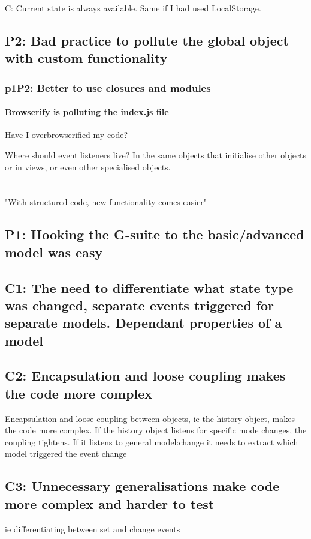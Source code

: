 \documentclass[english]{ifimaster}
\begin{document}
C: Current state is always available. Same if I had used LocalStorage.
\section{P2: Bad practice to pollute the global object with custom functionality}
\subsection{p1P2: Better to use closures and modules}
\subsubsection{Browserify is polluting the index.js file}
Have I overbrowserified my code?

Where should event listeners live? In the same objects that initialise other objects or in views, or even other specialised objects.

\chapter{}
"With structured code, new functionality comes easier"
\section{P1: Hooking the G-suite to the basic/advanced model was easy}
\section{C1: The need to differentiate what state type was changed, separate events triggered for separate models. Dependant properties of a model}
\section{C2: Encapsulation and loose coupling makes the code more complex}
Encapsulation and loose coupling between objects, ie the history object, makes the code more complex. If the history object listens for specific mode changes, the coupling tightens. If it listens to general model:change it needs to extract which model triggered the event change
\section{C3: Unnecessary generalisations make code more complex and harder to test}
ie differentiating between set and change events
\end{document}

